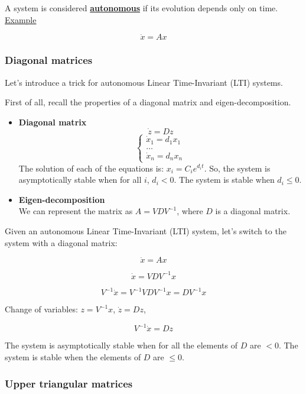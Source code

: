 A system is considered \underline{\textbf{autonomous}} if its evolution depends only on time.\\

\underline{Example}

\[
\dot{x} = Ax
\]

\subsubsection{Diagonal matrices}

Let's introduce a trick for autonomous Linear Time-Invariant (LTI) systems.

First of all, recall the properties of a diagonal matrix and eigen-decomposition.
\begin{itemize}
    \item \textbf{Diagonal matrix}
        \[\dot{z} = Dz\]
        \[
        \begin{cases}
            \dot{x}_1 = d_1 x_1 \\
            \dots \\
            \dot{x}_n = d_n x_n
        \end{cases}
        \]
        The solution of each of the equations is: \(x_i = C_i e^{d_i t}\).
        So, the system is asymptotically stable when for all \(i\), \(d_i < 0\). 
        The system is stable when \(d_i \leq 0\).
    \item \textbf{Eigen-decomposition}\\
        We can represent the matrix as \(A = VDV^{-1}\), where \(D\) is a diagonal matrix.
\end{itemize}

Given an autonomous Linear Time-Invariant (LTI) system, let's switch to the system with a diagonal matrix:

\[
\dot{x} = Ax
\]

\[
\dot{x} = VDV^{-1}x
\]

\[
V^{-1}\dot{x} = V^{-1}VDV^{-1}x = DV^{-1}x
\]

Change of variables: \(z = V^{-1}x\), \(\dot{z} = Dz\), 

\[
V^{-1}\dot{x} = Dz
\]

The system is asymptotically stable when for all the elements of \(D\) are \( < 0\). 
The system is stable when the elements of \(D\) are \(\leq 0\).  

\subsubsection{Upper triangular matrices}

